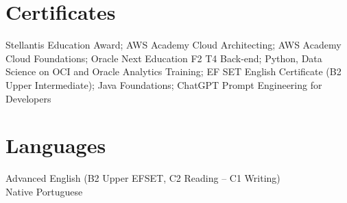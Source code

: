 \documentclass[letterpaper,11pt]{article}
\begin{document}
\section{Certificates}
{Stellantis Education Award; AWS Academy Cloud Architecting; AWS Academy Cloud Foundations; Oracle Next Education F2 T4 Back-end; Python, Data Science on OCI and Oracle Analytics Training; EF SET English Certificate (B2 Upper Intermediate); Java Foundations; ChatGPT Prompt Engineering for Developers}

\section{Languages}
{Advanced English (B2 Upper EFSET, C2 Reading – C1 Writing)} \\
{Native Portuguese}

 
\end{document}
